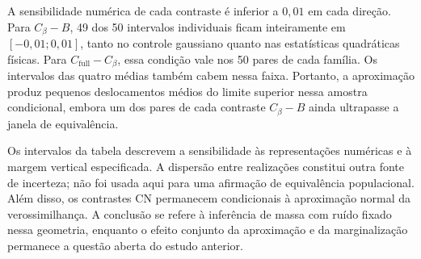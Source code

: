 A sensibilidade numérica de cada contraste é inferior a $0{,}01$ em
cada direção. Para $C_\beta-B$, 49 dos 50 intervalos individuais ficam
inteiramente em $[-0{,}01;0{,}01]$, tanto no controle gaussiano quanto
nas estatísticas quadráticas físicas. Para $C_{\mathrm{full}}-C_\beta$,
essa condição vale nos 50 pares de cada família. Os intervalos das
quatro médias também cabem nessa faixa. Portanto, a aproximação produz
pequenos deslocamentos médios do limite superior nessa amostra
condicional, embora um dos pares de cada contraste $C_\beta-B$ ainda
ultrapasse a janela de equivalência.

Os intervalos da tabela descrevem a sensibilidade às representações
numéricas e à margem vertical especificada. A dispersão entre
realizações constitui outra fonte de incerteza; não foi usada aqui
para uma afirmação de equivalência populacional. Além disso, os
contrastes CN permanecem condicionais à aproximação normal da
verossimilhança. A conclusão se refere à inferência de massa com ruído
fixado nessa geometria, enquanto o efeito conjunto da aproximação e
da marginalização permanece a questão aberta do estudo anterior.
